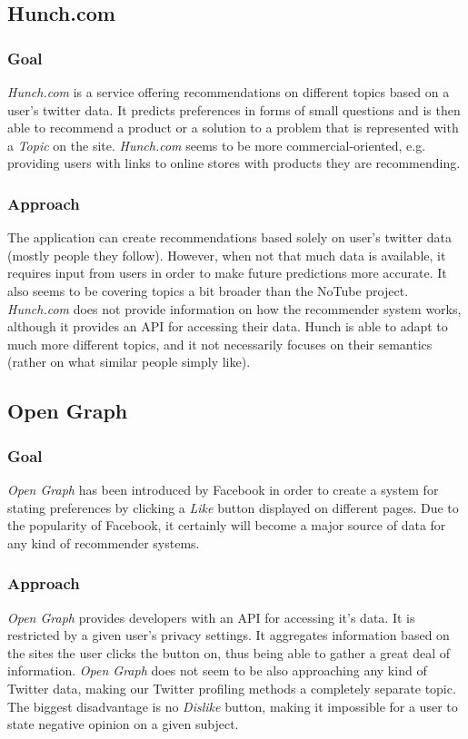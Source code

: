 \documentclass{article}
\begin{document}
\subsection{Hunch.com}
\subsubsection{Goal}
\textit{Hunch.com} is a service offering recommendations on different topics based on a user's twitter data. It predicts preferences in forms of small questions and is then able to recommend a product or a solution to a problem that is represented with a \textit{Topic} on the site. \textit{Hunch.com} seems to be more commercial-oriented, e.g. providing users with links to online stores with products they are recommending.

\subsubsection{Approach}
The application can create recommendations based solely on user's twitter data (mostly people they follow). However, when not that much data is available, it requires input from users in order to make future predictions more accurate. It also seems to be covering topics a bit broader than the NoTube project.
\textit{Hunch.com} does not provide information on how the recommender system works, although it provides an API for accessing their data.
Hunch is able to adapt to much more different topics, and it not necessarily focuses on their semantics (rather on what similar people simply like).

\subsection{Open Graph}
\subsubsection{Goal}
\textit{Open Graph} has been introduced by Facebook in order to create a system for stating preferences by clicking a \textit{Like} button displayed on different pages. Due to the popularity of Facebook, it certainly will become a major source of data for any kind of recommender systems.

\subsubsection{Approach}
\textit{Open Graph} provides developers with an API for accessing it's data. It is restricted by a given user's privacy settings.
It aggregates information based on the sites the user clicks the button on, thus being able to gather a great deal of information. \textit{Open Graph} does not seem to be also approaching any kind of Twitter data, making our Twitter profiling methods a completely separate topic.
The biggest disadvantage is no \textit{Dislike} button, making it impossible for a user to state negative opinion on a given subject.
\end{document}
